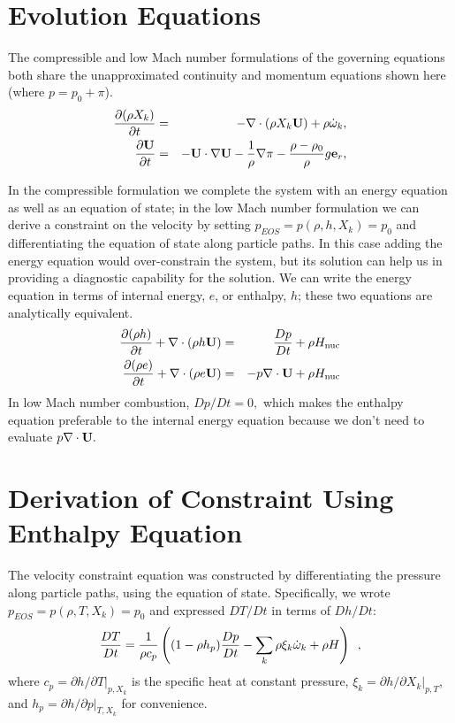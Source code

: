 \section{Evolution Equations}

The compressible and low Mach number formulations of the governing
equations both share the unapproximated continuity and momentum equations
shown here (where $p = p_0 + \pi$).
\begin{eqnarray}
\frac{\partial(\rho X_k)}{\partial t} &=& -\nabla\cdot(\rho X_k{\bf U}) + 
\rho\dot{\omega}_k,\label{eq:species}\\
\frac{\partial{\bf U}}{\partial t} &=& -{\bf U}\cdot\nabla{\bf U}  - 
  \frac{1}{\rho}\nabla\pi - 
  \frac{\rho-\rho_0}{\rho} g{\bf e}_r,\label{eq:momentum}
\end{eqnarray}

In the compressible formulation we complete the system with an energy
equation as well as an equation of state; in the low Mach number
formulation we can derive a constraint on the velocity by 
setting $p_{EOS} = p(\rho,h,X_k) = p_0$ and
differentiating the equation of state along particle paths.
In this case adding the energy equation would over-constrain the system, 
but its solution can help us in providing a diagnostic capability for the
solution.  We can write the energy equation in terms of internal energy, $e$,
or enthalpy, $h$; these two equations are analytically equivalent.
\begin{eqnarray}
\frac{\partial(\rho h)}{\partial t} + \nabla\cdot(\rho h\Ub) 
 &=& \frac{Dp}{Dt} + \rho\Hnuc \nonumber \\
%
\frac{\partial(\rho e)}{\partial t} + \nabla\cdot(\rho e \Ub)
 &=& - p\nabla\cdot \Ub + \rho\Hnuc \nonumber 
\end{eqnarray}
In low Mach number combustion, $Dp/Dt = 0,$ which makes the enthalpy equation
preferable to the internal energy equation because we don't need to
evaluate $p \nabla \cdot {\bf U}.$ 

\section{Derivation of Constraint Using Enthalpy Equation}

The velocity constraint equation was constructed by differentiating 
the pressure along particle paths, using the equation of state.  
Specifically, we wrote $p_{EOS} = p(\rho,T,X_k) = p_0$
and expressed $DT/Dt$ in terms of $Dh/Dt:$
\begin{equation}
\frac{DT}{Dt} = \frac{1}{\rho c_p} \left( (1 - \rho h_p) \frac{D p}{D t}
- \sum_k \rho \xi_k \dot{\omega}_k + \rho H \right) \enskip , \label{eq:dTdt}
\end{equation}
where $c_p = \left.\partial h/\partial T\right|_{p,X_k}$ is the
specific heat at constant pressure,
$\xi_k = \left.\partial h/\partial X_k \right|_{p,T}$,
and $h_p = \left.\partial h/\partial p\right|_{T,X_k}$
for convenience.

